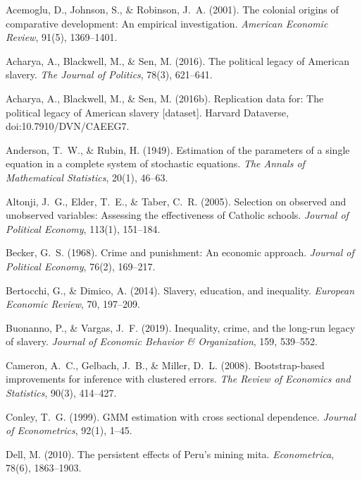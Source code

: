 \documentclass[12pt]{article}
\begin{document}
\newpage
\begin{thebibliography}{}

Acemoglu, D., Johnson, S., \& Robinson, J.~A. (2001).
The colonial origins of comparative development: An empirical investigation.
\textit{American Economic Review}, 91(5), 1369--1401.

Acharya, A., Blackwell, M., \& Sen, M. (2016).
The political legacy of American slavery.
\textit{The Journal of Politics}, 78(3), 621--641.

Acharya, A., Blackwell, M., \& Sen, M. (2016b).
Replication data for: The political legacy of American slavery [dataset].
Harvard Dataverse, doi:10.7910/DVN/CAEEG7.

Anderson, T.~W., \& Rubin, H. (1949).
Estimation of the parameters of a single equation in a complete system of stochastic equations.
\textit{The Annals of Mathematical Statistics}, 20(1), 46--63.

Altonji, J.~G., Elder, T.~E., \& Taber, C.~R. (2005).
Selection on observed and unobserved variables: Assessing the effectiveness of Catholic schools.
\textit{Journal of Political Economy}, 113(1), 151--184.

Becker, G.~S. (1968).
Crime and punishment: An economic approach.
\textit{Journal of Political Economy}, 76(2), 169--217.

Bertocchi, G., \& Dimico, A. (2014).
Slavery, education, and inequality.
\textit{European Economic Review}, 70, 197--209.

Buonanno, P., \& Vargas, J.~F. (2019).
Inequality, crime, and the long-run legacy of slavery.
\textit{Journal of Economic Behavior \& Organization}, 159, 539--552.

Cameron, A.~C., Gelbach, J.~B., \& Miller, D.~L. (2008).
Bootstrap-based improvements for inference with clustered errors.
\textit{The Review of Economics and Statistics}, 90(3), 414--427.

Conley, T.~G. (1999).
GMM estimation with cross sectional dependence.
\textit{Journal of Econometrics}, 92(1), 1--45.

Dell, M. (2010).
The persistent effects of Peru's mining mita.
\textit{Econometrica}, 78(6), 1863--1903.


\end{thebibliography}
\end{document}
